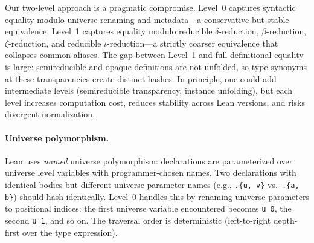 Our two-level approach is a pragmatic compromise.  Level~0 captures
syntactic equality modulo universe renaming and metadata---a
conservative but stable equivalence.  Level~1 captures equality modulo
reducible $\delta$-reduction, $\beta$-reduction, $\zeta$-reduction, and
reducible $\iota$-reduction---a strictly coarser equivalence that
collapses common aliases.  The gap between Level~1 and full definitional
equality is large: semireducible and opaque definitions are not
unfolded, so type synonyms at these transparencies create distinct
hashes.  In principle, one could add intermediate levels (semireducible
transparency, instance unfolding), but each level increases computation
cost, reduces stability across Lean versions, and risks divergent
normalization.

\paragraph{Universe polymorphism.}
Lean uses \emph{named} universe polymorphism: declarations are
parameterized over universe level variables with programmer-chosen
names.  Two declarations with identical bodies but different universe
parameter names (e.g., \texttt{.\{u, v\}} vs.\ \texttt{.\{a, b\}})
should hash identically.  Level~0 handles this by renaming universe
parameters to positional indices: the first universe variable
encountered becomes \texttt{u\_0}, the second \texttt{u\_1}, and so on.
The traversal order is deterministic (left-to-right depth-first over
the type expression).


